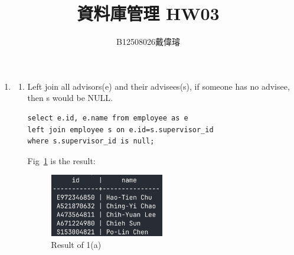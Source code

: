 \documentclass[12pt,a4paper]{article}
\title{資料庫管理 HW03}
\author{B12508026戴偉璿}
\date{}
\begin{document}
\maketitle


\begin{enumerate}
    \item 
    \begin{enumerate}
        \item Left join all advisors(e) and their advisees(s), if someone has no advisee, then s would be NULL.
        \begin{verbatim}
select e.id, e.name from employee as e
left join employee s on e.id=s.supervisor_id
where s.supervisor_id is null;
        \end{verbatim}
        Fig~\ref{fig:1a} is the result:
        \begin{figure}[H]
            \centering
            \includegraphics[width=0.5\textwidth]{src/1a.png}
            \caption{Result of 1(a)}
            \label{fig:1a}
        \end{figure}


\end{enumerate}
\end{enumerate}
\end{document}
